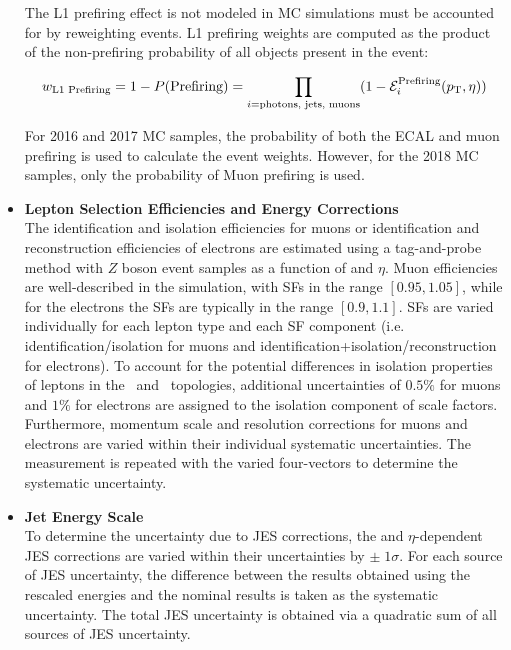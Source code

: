 \begin{itemize}
    The L1 prefiring effect is not modeled in MC simulations must be accounted for by reweighting events.
    L1 prefiring weights are computed as the product of the non-prefiring probability of all objects present in the event:
    \begin{linenomath*}
    \begin{align}
    w_{\text{L1 Prefiring}} = 1 - P(\text{Prefiring}) = \prod_{i=\text{photons, jets, muons}} (1 - \mathcal{E}_i^{\text{Prefiring}} (p_{\mathrm{T}},\eta))
    \end{align}
    \end{linenomath*}
    For 2016 and 2017 MC samples, the probability of both the ECAL and muon prefiring is used to calculate the event weights.
    However, for the 2018 MC samples, only the probability of Muon prefiring is used.
    \item {\bf Lepton Selection Efficiencies and Energy Corrections} \\
    The identification and isolation efficiencies for muons or identification and reconstruction efficiencies of electrons are estimated using a tag-and-probe method with $Z$ boson event samples as a function of \pT and $\eta$. 
    Muon efficiencies are well-described in the simulation, with SFs in the range $[0.95,1.05]$, while for the electrons the SFs are typically in the range $[0.9,1.1]$. 
    SFs are varied individually for each lepton type and each SF component (i.e. identification/isolation for muons and identification+isolation/reconstruction for electrons). 
    To account for the potential differences in isolation properties of leptons in the \ttbar\ and \zjets\ topologies, additional uncertainties of $0.5\%$ for muons and $1\%$ for electrons are assigned to the isolation component of scale factors.
    Furthermore, momentum scale and resolution corrections for muons and electrons are varied within their individual systematic uncertainties. 
    The measurement is repeated with the varied four-vectors to determine the systematic uncertainty.
    \item {\bf Jet Energy Scale} \\
    To determine the uncertainty due to JES corrections, the \pT and $\eta$-dependent JES corrections are varied within their uncertainties by $\pm \; 1 \sigma$. 
    For each source of JES uncertainty, the difference between the results obtained using the rescaled energies and the nominal results is taken as the systematic uncertainty. 
    The total JES uncertainty is obtained via a quadratic sum of all sources of JES uncertainty.

\end{itemize}
